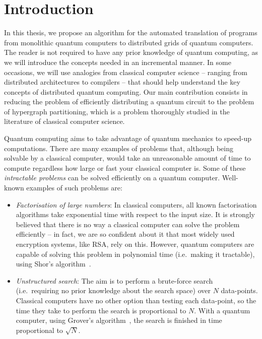 \chapter{Introduction}
\label{chap:Introduction}

In this thesis, we propose an algorithm for the automated translation of programs from monolithic quantum computers to distributed grids of quantum computers. The reader is not required to have any prior knowledge of quantum computing, as we will introduce the concepts needed in an incremental manner. In some occasions, we will use analogies from classical computer science -- ranging from distributed architectures to compilers -- that should help understand the key concepts of distributed quantum computing. Our main contribution consists in reducing the problem of efficiently distributing a quantum circuit to the problem of hypergraph partitioning, which is a problem thoroughly studied in the literature of classical computer science.

Quantum computing aims to take advantage of quantum mechanics to speed-up computations. There are many examples of problems that, although being solvable by a classical computer, would take an unreasonable amount of time to compute regardless how large or fast your classical computer is. Some of these \textit{intractable problems} can be solved efficiently on a quantum computer. Well-known examples of such problems are:

\begin{itemize} 
\item \textit{Factorisation of large numbers}: In classical computers, all known factorisation algorithms take exponential time with respect to the input size. It is strongly believed that there is no way a classical computer can solve the problem efficiently -- in fact, we are so confident about it that most widely used encryption systems, like RSA, rely on this. However, quantum computers are capable of solving this problem in polynomial time (i.e.\ making it tractable), using Shor's algorithm~\citep{Shor}.
\item \textit{Unstructured search}: The aim is to perform a brute-force search (i.e.\ requiring no prior knowledge about the search space) over \(N\) data-points. Classical computers have no other option than testing each data-point, so the time they take to perform the search is proportional to \(N\). With a quantum computer, using Grover's algorithm~\citep{Grover}, the search is finished in time proportional to \(\sqrt{N}\).
\end{itemize}


